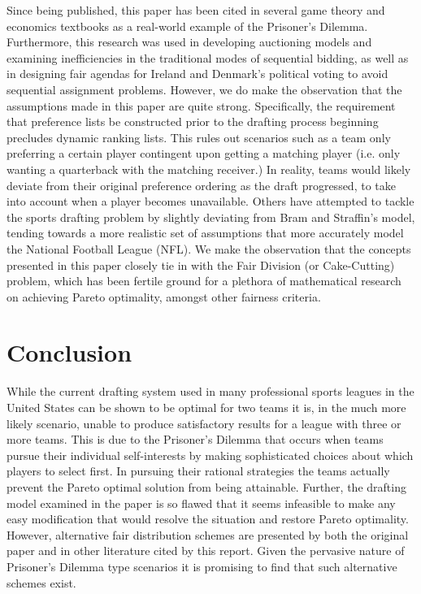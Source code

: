 \documentclass{article}
\begin{document}
Since being published, this paper has been cited in several game theory and economics textbooks \cite{straffin93}\cite{thomas03}\cite{roth92} as a real-world example of the Prisoner's Dilemma. Furthermore, this research was used in developing auctioning models and examining inefficiencies in the traditional modes of sequential bidding, as well as in designing fair agendas for Ireland and Denmark's political voting \cite{oleary05}  to avoid sequential assignment problems. 
However, we do make the observation that the assumptions made in this paper are quite strong. Specifically, the requirement that preference lists be constructed prior to the drafting process beginning precludes dynamic ranking lists. This rules out scenarios such as a team only preferring a certain player contingent upon getting a matching player (i.e. only wanting a quarterback with the matching receiver.) In reality, teams would likely deviate from their original preference ordering as the draft progressed, to take into account when a player becomes unavailable. Others \cite{fry07} have attempted to tackle the sports drafting problem by slightly deviating from Bram and Straffin's model, tending towards a more realistic set of assumptions that more accurately model the National Football League (NFL).
We make the observation that the concepts presented in this paper closely tie in with the Fair Division (or Cake-Cutting) problem, which has been fertile ground for a plethora of mathematical research on achieving Pareto optimality, amongst other fairness criteria.

\section{Conclusion}

While the current drafting system used in many professional sports leagues in the United States can be shown to be optimal for two teams it is, in the much more likely scenario, unable to produce satisfactory results for a league with three or more teams. This is due to the Prisoner's Dilemma that occurs when teams pursue their individual self-interests by making sophisticated choices about which players to select first. In pursuing their rational strategies the teams actually prevent the Pareto optimal solution from being attainable. Further, the drafting model examined in the paper is so flawed that it seems infeasible to make any easy modification that would resolve the situation and restore Pareto optimality. However, alternative fair distribution schemes are presented by both the original paper and in other literature cited by this report. Given the pervasive nature of Prisoner's Dilemma type scenarios it is promising to find that such alternative schemes exist. 

\pagebreak[4]
{}

\end{document}
